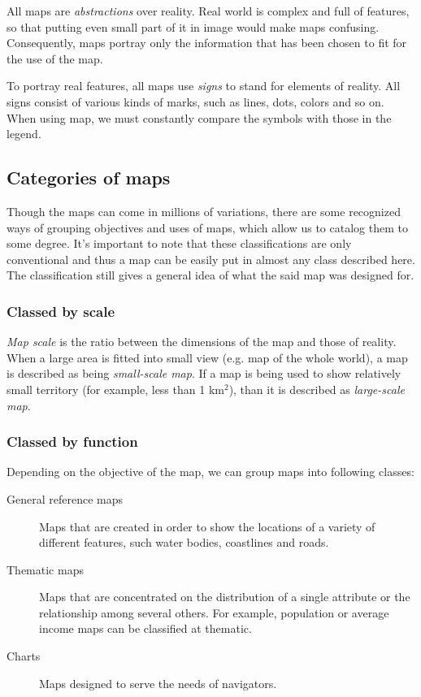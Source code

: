 \documentclass[letterpaper]{article}
\begin{document}
All maps are \emph{abstractions} over reality. Real world is complex and full of features, so that
putting even small part of it in image would make maps confusing.
Consequently, maps portray only the information that has been chosen to fit for
the use of the map.

To portray real features, all maps use \emph{signs} to stand for elements of reality. All signs consist of various kinds of marks, such as lines, dots, colors and so on. When using map, we must constantly compare the symbols with those in the legend.

\subsection{Categories of maps}
\label{sec:categories-maps}

Though the maps can come in millions of variations, there are some recognized ways of grouping
objectives and uses of maps, which allow us to catalog them to some degree. It's important to
note that these classifications are only conventional and thus a map can be easily
put in almost any class described here. The classification still gives a general idea
of what the said map was designed for.

\subsubsection{Classed by scale}
\label{sec:classed-scale}

\emph{Map scale} is the ratio between the dimensions of the map and those of reality.
When a large area is fitted into small view (e.g. map of the whole world), a map
is described as being \emph{small-scale map}. If a map is being used to show relatively
small territory (for example, less than 1 km$^{2}$), than it is described as
\emph{large-scale map}.

\subsubsection{Classed by function}
\label{sec:classed-function}

Depending on the objective of the map, we can group maps into following classes:
\begin{description}
\item[General reference maps] Maps that are created in order to show the locations
of a variety of different features, such water bodies, coastlines and roads.
\item[Thematic maps] Maps that are concentrated on the distribution of a single
attribute or the relationship among several others. For example, population
or average income maps can be classified at thematic.
\item[Charts] Maps designed to serve the needs of navigators.
\end{description}
\end{document}
